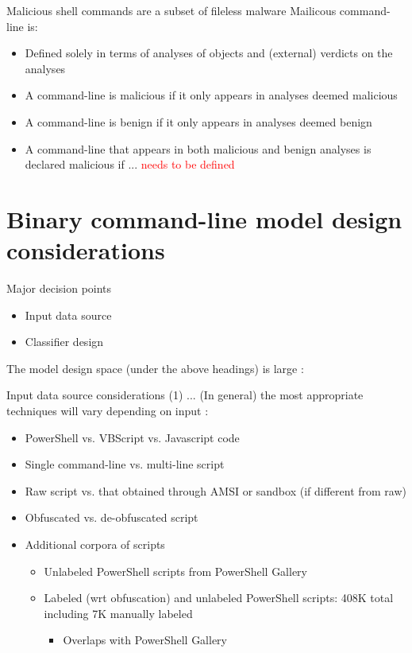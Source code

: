 \documentclass[10pt]{beamer}
\begin{document}
\begin{frame}{Malicious shell commands are a subset of fileless malware}
	Mailicous command-line is:
	\begin{itemize}
		\item Defined solely in terms of analyses of objects and (external) verdicts on the analyses
		\item A command-line is malicious if it only appears in analyses deemed malicious
		\item A command-line is benign if it only appears in analyses deemed benign
		\item A command-line that appears in both malicious and benign analyses is declared malicious if ... \textcolor{red}{needs to be defined}
	\end{itemize}
\end{frame}

\section{Binary command-line model design considerations}

\begin{frame}[fragile]{Major decision points}
	\begin{itemize}
		\item Input data source
		\item Classifier design
	\end{itemize}

	The model design space (under the above headings) is large \cite{survey2021,msft2017,powershell2018,amsi2019,feye2018,feye2018-2,textcnn2016,textcnn2019,transformers2019}:
\end{frame}

\begin{frame}{Input data source considerations (1) ...}
	(In general) the most appropriate techniques will vary depending on input \cite{msft2017-2,msft2019,feye2018}:
	\begin{itemize}
		\item PowerShell vs. VBScript vs. Javascript code 
		\item Single command-line vs. multi-line script
		\item Raw script vs. that obtained through AMSI or sandbox (if different from raw)
		\item Obfuscated vs. de-obfuscated script
		\item Additional corpora of scripts
		\begin{itemize}
			\item Unlabeled PowerShell scripts from PowerShell Gallery \cite{data1}
			\item Labeled (wrt obfuscation) and unlabeled PowerShell scripts: 408K total including 7K manually labeled \cite{data21,data22}
			\begin {itemize}
				\item Overlaps with PowerShell Gallery
			\end {itemize}
		\end{itemize}
	\end{itemize}
\end{frame}
\end{document}
